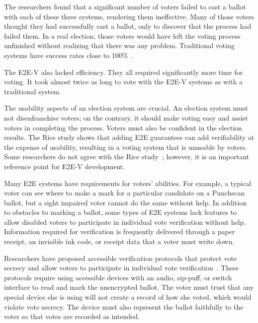The researchers found that a significant number of voters failed to
cast a ballot with each of these three systems, rendering them
ineffective. Many of those voters thought they had successfully cast a
ballot, only to discover that the process had failed them. In a real
election, those voters would have left the voting process unfinished
without realizing that there was any problem. Traditional voting
systems have success rates close to 100\%~\cite{byrne2007usability}.

The E2E-V also lacked efficiency. They all required significantly more
time for voting. It took almost twice as long to vote with the E2E-V
systems as with a traditional system.

The usability aspects of an election system are crucial. An election
system must not disenfranchise voters; on the contrary, it should
make voting easy and assist voters in completing the process. Voters
must also be confident in the election results. The Rice study
shows that adding E2E guarantees can add verifiability at the expense
of usability, resulting in a voting system that is unusable by
voters. Some researchers do not agree with the Rice
study~\cite{mcburnett2014}; however, it is an important reference
point for E2E-V development. 


Many E2E systems have requirements for voters' abilities. For example,
a typical voter can see where to make a mark for a particular
candidate on a Punchscan ballot, but a sight impaired voter cannot do
the same without help. In addition to obstacles to marking a ballot,
some types of E2E systems lack features to allow disabled voters to
participate in individual vote verification without help. Information
required for verification is frequently delivered through a paper
receipt, an invisible ink code, or receipt data that a voter must
write down.

Researchers have proposed accessible verification protocols that
protect vote secrecy and allow voters to participate in individual
vote verification~\cite{chaum2009accessible}. These protocols require
using accessible devices with an audio, sip-puff, or switch interface
to read and mark the unencrypted ballot. The voter must trust that any
special device she is using will not create a record of how she voted,
which would violate vote secrecy. The device must also represent the
ballot faithfully to the voter so that votes are recorded as intended.

